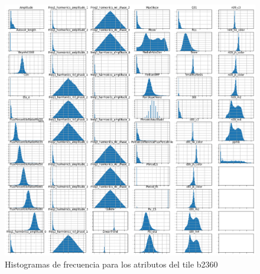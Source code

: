 \begin{appendix}
\begin{figure}[h!]
  \includegraphics[width=\textwidth]{Kap6/allfeatures_b360.png}
    \caption{Histogramas de frecuencia para los atributos del tile b2360}
\end{figure}

\end{appendix}